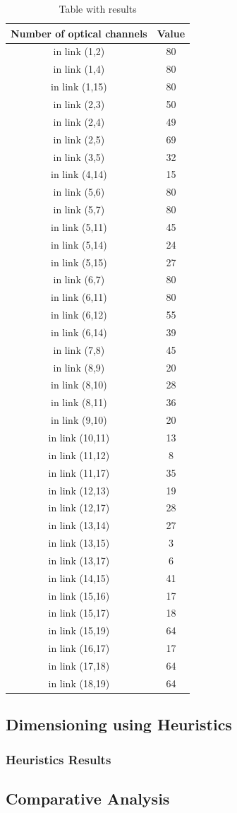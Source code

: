 \begin{table}[h!]
\centering
\begin{tabular}{|| c | c||}
 \hline
 Number of optical channels & Value \\
 \hline\hline
 in link (1,2) & 80 \\
in link (1,4) & 80 \\
in link (1,15) & 80 \\
in link (2,3) & 50 \\
in link (2,4) & 49 \\
in link (2,5) & 69 \\
in link (3,5) & 32 \\
in link (4,14) & 15 \\
in link (5,6) & 80 \\
in link (5,7) & 80 \\
in link (5,11) & 45 \\
in link (5,14) & 24 \\
in link (5,15) & 27 \\
in link (6,7) & 80 \\
in link (6,11) & 80 \\
in link (6,12) & 55 \\
in link (6,14) & 39 \\
in link (7,8) & 45 \\
in link (8,9) & 20 \\
in link (8,10) & 28 \\
in link (8,11) & 36 \\
in link (9,10) & 20 \\
in link (10,11) & 13 \\
in link (11,12) & 8 \\
in link (11,17) & 35 \\
in link (12,13) & 19 \\
in link (12,17) & 28 \\
in link (13,14) & 27 \\
in link (13,15) & 3 \\
in link (13,17) & 6 \\
in link (14,15) & 41 \\
in link (15,16) & 17 \\
in link (15,17) & 18 \\
in link (15,19) & 64 \\
in link (16,17) & 17 \\
in link (17,18) & 64 \\
in link (18,19) & 64 \\
\hline
\end{tabular}
\caption{Table with results}
\label{result_ILP4}
\end{table}


\subsection{Dimensioning using Heuristics}

\subsubsection{Heuristics Results}

\subsection{Comparative Analysis} 